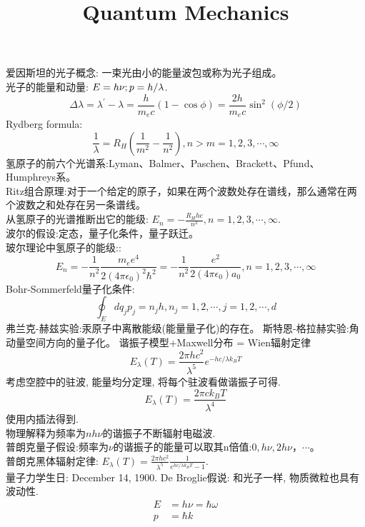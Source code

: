 \documentclass[UTF8]{ctexart}
\title{Quantum Mechanics}
\numberwithin{equation}{subsection}
\begin{document}
\maketitle
\tableofcontents
\newpage
{}
爱因斯坦的光子概念: 一束光由小的能量波包或称为光子组成。\\
光子的能量和动量: $E = h\nu; p = h/\lambda$.
$$
\Delta \lambda=\lambda^{\prime}-\lambda=\frac{h}{m_{e} c}(1-\cos \phi)=\frac{2 h}{m_{e} c} \sin ^{2}(\phi / 2)
$$
Rydberg formula:
$$
\frac{1}{\lambda}=R_{H}\left(\frac{1}{m^{2}}-\frac{1}{n^{2}}\right), n>m=1,2,3, \cdots, \infty
$$
氢原子的前六个光谱系:Lyman、Balmer、Paschen、Brackett、Pfund、Humphreys系。\\
Ritz组合原理:对于一个给定的原子，如果在两个波数处存在谱线，那么通常在两个波数之和处存在另一条谱线。\\
从氢原子的光谱推断出它的能级: $E_{n}=-\frac{R_{H} h c}{n^{2}}, n=1,2,3, \cdots, \infty$.\\
波尔的假设:定态，量子化条件，量子跃迁。\\
玻尔理论中氢原子的能级::
$$
E_{n}=-\frac{1}{n^{2}} \frac{m_{e} e^{4}}{2\left(4 \pi \epsilon_{0}\right)^{2} \hbar^{2}}=-\frac{1}{n^{2}} \frac{e^{2}}{2\left(4 \pi \epsilon_{0}\right) a_{0}}, n=1,2,3, \cdots, \infty
$$
Bohr-Sommerfeld量子化条件:
$$
\oint_{E} d q_{j} p_{j}=n_{j} h, n_{j}=1,2, \cdots, j=1,2, \cdots, d
$$
弗兰克-赫兹实验:汞原子中离散能级(能量量子化)的存在。
斯特恩-格拉赫实验:角动量空间方向的量子化。
谐振子模型+Maxwell分布 = Wien辐射定律
$$
E_{\lambda}(T)=\frac{2 \pi h c^{2}}{\lambda^{5}} e^{-h c / \lambda k_{B} T}
$$
考虑空腔中的驻波, 能量均分定理, 将每个驻波看做谐振子可得. 
$$
E_{\lambda}(T)=\frac{2 \pi c k_{B} T}{\lambda^{4}}
$$
使用内插法得到.\\
物理解释为频率为$nh\nu$的谐振子不断辐射电磁波.\\
普朗克量子假设:频率为$\nu$的谐振子的能量可以取其n倍值:$0,h\nu,2h\nu，\cdots$。\\
普朗克黑体辐射定律: $E_{\lambda}(T)=\frac{2 \pi h c^{2}}{\lambda^{5}} \frac{1}{e^{h c / \lambda k_{B} T}-1}$.\\
量子力学生日: December 14, 1900.
De Broglie假说: 和光子一样, 物质微粒也具有波动性. 
$$\begin{aligned}
E &= h\nu = \hbar \omega \\
{p} &= \hbar {k}
\end{aligned}$$
\end{document}
